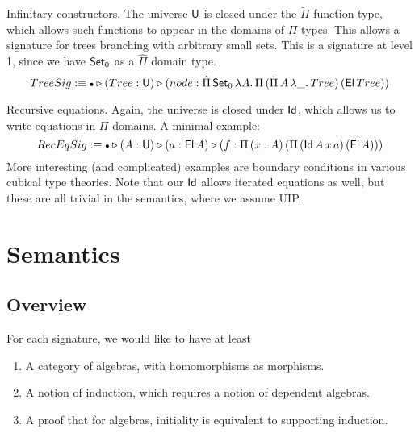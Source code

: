 \documentclass[sigplan,review,anonymous]{acmart}\settopmatter{printfolios=true,printccs=false,printacmref=false}
\makeatletter
\newcommand{\Lift}{\Uparrow}
\newcommand{\ext}{\triangleright}
\newcommand{\emptycon}{\scaleobj{.75}\bullet}
\newcommand{\Pii}{\Pi}
\newcommand{\Pie}{\hat{\Pi}}
\newcommand{\Piinf}{\tilde{\Pi}}
\newcommand{\appitt}{\mathop{{\scriptstyle @}}}
\newcommand{\IdU}{\mathsf{IdU}}
\makeatother
\begin{document}
\begin{example}{Infinitary constructors}. The universe $\mathsf{U}$ is closed under
the $\Piinf$ function type, which allows such functions to appear in the domains
of $\Pii$ types. This allows a signature for trees branching with arbitrary
small sets. This is a signature at level 1, since we have $\mathsf{Set}_0$ as a $\Pie$
domain type.
\[
TreeSig :\equiv
\emptycon \ext (Tree : \U) \ext (node : \Pie\,\Set_0\,\lambda A.\,\Pii\,(\Piinf\,A\,\lambda \_.\,Tree)\,(\El\,Tree))
\]
\end{example}


\begin{example}{Recursive equations}. Again, the universe is closed under $\mathsf{Id}$, which allows us to write equations
in $\Pii$ domains. A minimal example:
\[
RecEqSig :\equiv \emptycon \ext (A : \U) \ext (a : \El\,A) \ext (f : \Pii\,(x : A)\,(\Pii\,(\Id\,A\,x\,a)\,(\El\,A)))
\]
More interesting (and complicated) examples are boundary conditions in various
cubical type theories\cite{TODO}. Note that our $\mathsf{Id}$ allows iterated equations
as well, but these are all trivial in the semantics, where we assume UIP.
\end{example}

\section{Semantics}
\label{sec:semantics}

\subsection{Overview}

For each signature, we would like to have at least
\begin{enumerate}
  \item A category of algebras, with homomorphisms as morphisms.
  \item A notion of induction, which requires a notion of dependent algebras.
  \item A proof that for algebras, initiality is equivalent to supporting induction.
\end{enumerate}
\end{document}
